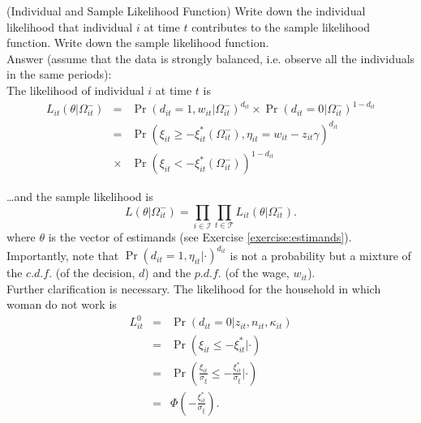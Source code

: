 \begin{exercise} (Individual and Sample Likelihood Function)  \label{exercise:likelihood}
Write down the individual likelihood that individual $i$ at time $t$ contributes to the sample likelihood function. Write down the sample likelihood function.\\
\noindent Answer (assume that the data is strongly balanced, i.e. observe all the individuals in the same periods):\\
\noindent The likelihood of individual $i$ at time $t$ is
\begin{eqnarray}
L_{it} \left( \theta | \Omega_{it}^{-} \right) &=& \Pr \left(  d_{it} = 1, w_{it} | \Omega_{it}^{-} \right)^{d_{it}} \times \Pr \left(  d_{it} = 0 | \Omega_{it}^{-} \right)^{1-d_{it}} \nonumber \\
&=& \Pr \left( \xi_{it} \geq - \xi_{it}^{*} \left(\Omega_{it}^{-} \right), \eta_{it} = w_{it} - z_{it} \gamma  \right) ^{d_{it}} \nonumber \\  
&\times& \Pr \left( \xi_{it} < - \xi_{it}^{*} \left(\Omega_{it}^{-} \right) \right) ^{1 - d_{it}}
\end{eqnarray}

\noindent \ldots and the sample likelihood is
\begin{equation}
L \left( \theta | \Omega_{it}^{-} \right) = \prod \limits _{i \in \mathcal{I}} \prod \limits _{t \in \mathcal{T}} L_{it} \left( \theta | \Omega_{it} ^{-} \right).
\end{equation}
\noindent where $\theta$ is the vector of estimands (see Exercise \ref{exercise:estimands}). Importantly, note that $\Pr \left(  d_{it} = 1, \eta_{it} | \cdot \right)^{d_{it}}$ is not a probability but a mixture of the $c.d.f.$ (of the decision, $d$) and the $p.d.f.$ (of the wage, $w_{it}$).\\
\noindent Further clarification is necessary. The likelihood for the household in which woman do not work is
\begin{eqnarray}
L_{it}^{0} &=& \Pr \left( d_{it} = 0 | z_{it}, n_{it}, \kappa_{it} \right) \nonumber \\
       &=& \Pr \left( \xi_{it} \leq - \xi_{it}^{*} | \cdot \right) \nonumber \\
       &=& \Pr \left( \frac{\xi_{it}}{\sigma_{\xi}} \leq - \frac{\xi_{it}^{*}}{\sigma_{\xi}} | \cdot \right) \nonumber \\
       &=& \Phi \left( - \frac{\xi_{it}^{*}}{\sigma_{\xi}}  \right). 
\end{eqnarray}


\end{exercise}
